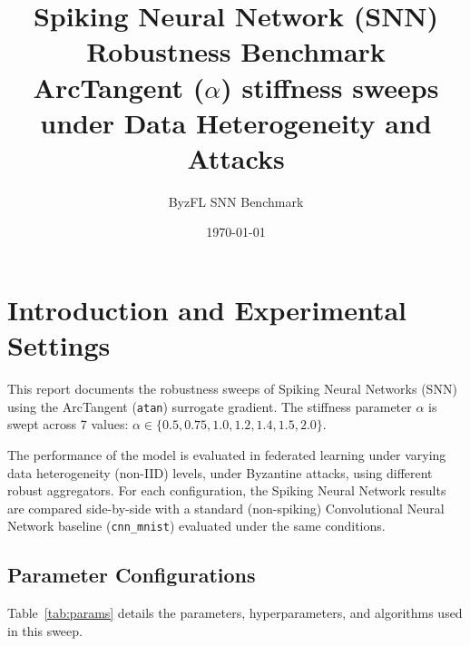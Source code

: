 \documentclass{article}
\title{Spiking Neural Network (SNN) Robustness Benchmark\\ArcTangent ($\alpha$) stiffness sweeps under Data Heterogeneity and Attacks}
\author{ByzFL SNN Benchmark}
\date{\today}
\begin{document}
\maketitle

\clearpage
\tableofcontents
\clearpage

\section{Introduction and Experimental Settings}
This report documents the robustness sweeps of Spiking Neural Networks (SNN) using the ArcTangent (\texttt{atan}) surrogate gradient. The stiffness parameter $\alpha$ is swept across 7 values: $\alpha \in \{0.5, 0.75, 1.0, 1.2, 1.4, 1.5, 2.0\}$. 

The performance of the model is evaluated in federated learning under varying data heterogeneity (non-IID) levels, under Byzantine attacks, using different robust aggregators. For each configuration, the Spiking Neural Network results are compared side-by-side with a standard (non-spiking) Convolutional Neural Network baseline (\texttt{cnn\_mnist}) evaluated under the same conditions.


\subsection{Parameter Configurations}
Table~\ref{tab:params} details the parameters, hyperparameters, and algorithms used in this sweep.
\end{document}
